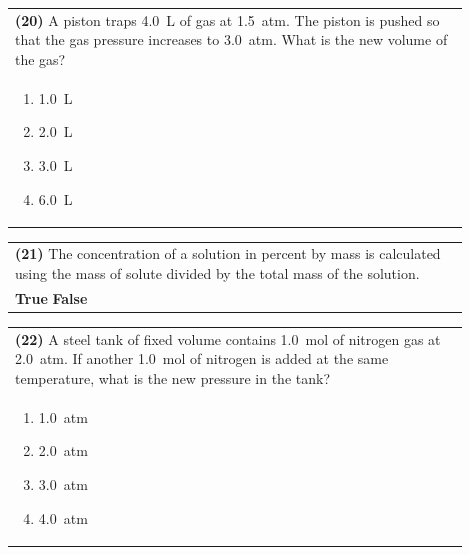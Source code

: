 \documentclass{article}
\begin{document}
{{\noindent\begin{tabular}{|p{0.9\linewidth}|}
\hline
\textbf{(20)} A piston traps 4.0~L of gas at 1.5~atm. The piston is pushed so that the gas pressure increases to 3.0~atm. What is the new volume of the gas?\\[0.2cm]
\begin{minipage}[t]{0.85\linewidth}
\begin{enumerate}[label=\alph*.]
\item 1.0~L
\item 2.0~L
\item 3.0~L
\item 6.0~L
\end{enumerate}
\end{minipage}\\[0.2cm]
\hline
\end{tabular}
\newpage

\vspace{0.2cm}
\noindent\begin{tabular}{|p{0.9\linewidth}|}
\hline
\textbf{(21)} The concentration of a solution in percent by mass is calculated using the mass of solute divided by the total mass of the solution.\\[0.2cm]
\textbf{True} \hspace{1cm} \textbf{False}\\[0.2cm]
\hline
\end{tabular}

\vspace{0.2cm}
\noindent\begin{tabular}{|p{0.9\linewidth}|}
\hline
\textbf{(22)} A steel tank of fixed volume contains 1.0~mol of nitrogen gas at 2.0~atm. If another 1.0~mol of nitrogen is added at the same temperature, what is the new pressure in the tank?\\[0.2cm]
\begin{minipage}[t]{0.85\linewidth}
\begin{enumerate}[label=\alph*.]
\item 1.0~atm
\item 2.0~atm
\item 3.0~atm
\item 4.0~atm
\end{enumerate}
\end{minipage}\\[0.2cm]
\hline
\end{tabular}

}}
\end{document}
